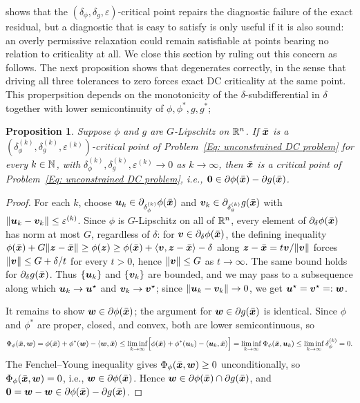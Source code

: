 \documentclass[english]{article}
\newtheorem{proposition}{Proposition}[section]
\begin{document}
 shows that the $(\delta_\phi,\delta_g,\varepsilon)$-critical point repairs the diagnostic failure of the exact residual, but a diagnostic that is easy to satisfy is only useful if it is also sound: an overly permissive relaxation could remain satisfiable at points bearing no relation to criticality at all. We close this section by ruling out this concern as follows.
 The next proposition shows that  degenerates correctly, in the sense that driving all three tolerances to zero forces exact DC criticality at the same point.
This properpsition depends on the monotonicity of the $\delta$-subdifferential in $\delta$ together with lower semicontinuity of $\phi,\phi^*,g,g^*$; 

\begin{proposition}
\label{prop:exact-consistency}
Suppose $\phi$ and $g$ are $G$-Lipschitz on $\mathbb{R}^n$. If $\bar{\bm{x}}$ is a $(\delta_\phi^{(k)},\delta_g^{(k)},\varepsilon^{(k)})$-critical point of Problem~\eqref{Eq: unconstrained DC problem} for every $k\in\mathbb{N}$, with $\delta_\phi^{(k)},\delta_g^{(k)},\varepsilon^{(k)}\to0$ as $k\to\infty$, then $\bar{\bm{x}}$ is a critical point of Problem~\eqref{Eq: unconstrained DC problem}, i.e., $\bm{0}\in\partial\phi(\bar{\bm{x}})-\partial g(\bar{\bm{x}})$.
\end{proposition}

\begin{proof}
For each $k$, choose $\bm{u}_k\in\partial_{\delta_\phi^{(k)}}\phi(\bar{\bm{x}})$ and $\bm{v}_k\in\partial_{\delta_g^{(k)}}g(\bar{\bm{x}})$ with $\|\bm{u}_k-\bm{v}_k\|\le\varepsilon^{(k)}$. Since $\phi$ is $G$-Lipschitz on all of $\mathbb{R}^n$, every element of $\partial_\delta\phi(\bar{\bm{x}})$ has norm at most $G$, regardless of $\delta$: for $\bm{v}\in\partial_\delta\phi(\bar{\bm{x}})$, the defining inequality $\phi(\bar{\bm{x}})+G\|\bm{z}-\bar{\bm{x}}\|\ge\phi(\bm{z})\ge\phi(\bar{\bm{x}})+\langle\bm{v},\bm{z}-\bar{\bm{x}}\rangle-\delta$ along $\bm{z}-\bar{\bm{x}}=t\bm{v}/\|\bm{v}\|$ forces $\|\bm{v}\|\le G+\delta/t$ for every $t>0$, hence $\|\bm{v}\|\le G$ as $t\to\infty$. The same bound holds for $\partial_\delta g(\bar{\bm{x}})$. Thus $\{\bm{u}_k\}$ and $\{\bm{v}_k\}$ are bounded, and we may pass to a subsequence along which $\bm{u}_k\to\bm{u}^\star$ and $\bm{v}_k\to\bm{v}^\star$; since $\|\bm{u}_k-\bm{v}_k\|\to0$, we get $\bm{u}^\star=\bm{v}^\star=:\bm{w}$.

It remains to show $\bm{w}\in\partial\phi(\bar{\bm{x}})$; the argument for $\bm{w}\in\partial g(\bar{\bm{x}})$ is identical. Since $\phi$ and $\phi^*$ are proper, closed, and convex, both are lower semicontinuous, so
\[
    \Phi_\phi(\bar{\bm{x}},\bm{w})
    =\phi(\bar{\bm{x}})+\phi^*(\bm{w})-\langle\bm{w},\bar{\bm{x}}\rangle
    \le\liminf_{k\to\infty}\Bigl[\phi(\bar{\bm{x}})+\phi^*(\bm{u}_k)-\langle\bm{u}_k,\bar{\bm{x}}\rangle\Bigr]
    =\liminf_{k\to\infty}\Phi_\phi(\bar{\bm{x}},\bm{u}_k)
    \le\liminf_{k\to\infty}\delta_\phi^{(k)}=0.
\]
The Fenchel--Young inequality gives $\Phi_\phi(\bar{\bm{x}},\bm{w})\ge0$ unconditionally, so $\Phi_\phi(\bar{\bm{x}},\bm{w})=0$, i.e., $\bm{w}\in\partial\phi(\bar{\bm{x}})$. Hence $\bm{w}\in\partial\phi(\bar{\bm{x}})\cap\partial g(\bar{\bm{x}})$, and $\bm{0}=\bm{w}-\bm{w}\in\partial\phi(\bar{\bm{x}})-\partial g(\bar{\bm{x}})$.
\end{proof}
\end{document}
